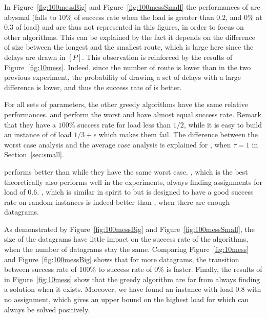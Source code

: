 \vspace{1cm}

In Figure~\ref{fig:100messBig} and Figure~\ref{fig:100messSmall} the performances of \shortestlongest are abysmal (falls to $10\%$ of success rate when the load is greater than $0.2$, and $0\%$ at $0.3$ of load) and are thus not represented in this figures, in order to focus on other algorithms. This can be explained by the fact it depends on the difference of size between the longest and the smallest route, which is large here since the delays are drawn in $[P]$. This observation is reinforced by the results of Figure~\ref{fig:10mess}. Indeed, since the number of route is lower than in the two previous experiment, the probability of drawing a set of delays with a large difference is lower, and thus the success rate of \shortestlongest is better. 

For all sets of parameters, the other greedy algorithms have the same relative performances. \metaoffset and \greedyuniform
perform the worst and have almost equal success rate. Remark that they have a $100\%$ success rate for load
less than $1/2$, while it is easy to build an instance of \pma of load $1/3 +\epsilon$ which makes them fail. 
The difference between the worst case analysis and the average case analysis is explained for \greedyuniform, when $\tau = 1$ in Section~\ref{sec:small}.

\firstfit performs better than \metaoffset while they have the same worst case. \compactpair, which is the best theoretically also performs well in the experiments, always finding assignments for load of $0.6$.  \compactfit, which is similar in spirit to \compactpair but is designed to have a good success rate on random instances is indeed better than  \compactpair, when there are enough datagrams.

As demonstrated by Figure~\ref{fig:100messBig} and Figure~\ref{fig:100messSmall}, the size of the datagrams have little impact on the success rate of the algorithms, when the number of datagrams stay the same. Comparing Figure~\ref{fig:10mess} and Figure~\ref{fig:100messBig} shows that for more datagrams, the transition between success rate of $100\%$ to success rate of $0\%$ is faster.
Finally, the results of \ESCA in Figure~\ref{fig:10mess} show that the greedy algorithm are far from always finding a solution when it exists. Moreover, we have found an instance with load $0.8$ with no assignment, which gives an upper bound on the highest load for which \pma can always be solved positively.

